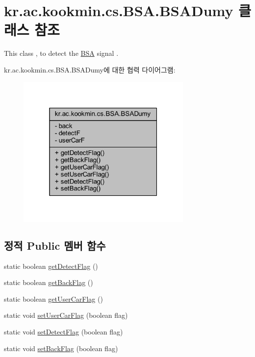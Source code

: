 \hypertarget{classkr_1_1ac_1_1kookmin_1_1cs_1_1_b_s_a_1_1_b_s_a_dumy}{}\section{kr.\+ac.\+kookmin.\+cs.\+B\+S\+A.\+B\+S\+A\+Dumy 클래스 참조}
\label{classkr_1_1ac_1_1kookmin_1_1cs_1_1_b_s_a_1_1_b_s_a_dumy}


This class , to detect the \hyperlink{namespacekr_1_1ac_1_1kookmin_1_1cs_1_1_b_s_a}{B\+S\+A} signal .  




kr.\+ac.\+kookmin.\+cs.\+B\+S\+A.\+B\+S\+A\+Dumy에 대한 협력 다이어그램\+:\nopagebreak
\begin{figure}[H]
\begin{center}
\leavevmode
\includegraphics[width=244pt]{classkr_1_1ac_1_1kookmin_1_1cs_1_1_b_s_a_1_1_b_s_a_dumy__coll__graph}
\end{center}
\end{figure}
\subsection*{정적 Public 멤버 함수}
\begin{DoxyCompactItemize}
\item 
static boolean \hyperlink{classkr_1_1ac_1_1kookmin_1_1cs_1_1_b_s_a_1_1_b_s_a_dumy_a91ee92dabba61da78268000d16735492}{get\+Detect\+Flag} ()
\item 
static boolean \hyperlink{classkr_1_1ac_1_1kookmin_1_1cs_1_1_b_s_a_1_1_b_s_a_dumy_a636e4ba1005c1d6c31079c086529f702}{get\+Back\+Flag} ()
\item 
static boolean \hyperlink{classkr_1_1ac_1_1kookmin_1_1cs_1_1_b_s_a_1_1_b_s_a_dumy_a9adca5a9e0136713dee1023f90acc829}{get\+User\+Car\+Flag} ()
\item 
static void \hyperlink{classkr_1_1ac_1_1kookmin_1_1cs_1_1_b_s_a_1_1_b_s_a_dumy_afe0bc16e3df1ff7bcf74d310c6a0f009}{set\+User\+Car\+Flag} (boolean flag)
\item 
static void \hyperlink{classkr_1_1ac_1_1kookmin_1_1cs_1_1_b_s_a_1_1_b_s_a_dumy_ab432efb89032b15aab5d86c18129ca47}{set\+Detect\+Flag} (boolean flag)
\item 
static void \hyperlink{classkr_1_1ac_1_1kookmin_1_1cs_1_1_b_s_a_1_1_b_s_a_dumy_ab95daa3749ab4050189bbfe02064eb42}{set\+Back\+Flag} (boolean flag)
\end{DoxyCompactItemize}
